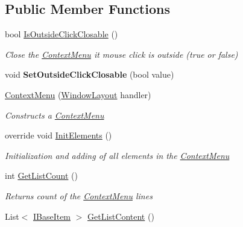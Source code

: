 \subsection*{Public Member Functions}
\begin{DoxyCompactItemize}
\item 
bool \mbox{\hyperlink{class_space_v_i_l_1_1_context_menu_ab679391d913d15a6341e9ccb0f3b4bf9}{Is\+Outside\+Click\+Closable}} ()
\begin{DoxyCompactList}\small\item\em Close the \mbox{\hyperlink{class_space_v_i_l_1_1_context_menu}{Context\+Menu}} it mouse click is outside (true or false) \end{DoxyCompactList}\item 
\mbox{\label{class_space_v_i_l_1_1_context_menu_aac0e4cbcc49f86a04fbab993b35d84b9}} 
void {\bfseries Set\+Outside\+Click\+Closable} (bool value)
\item 
\mbox{\hyperlink{class_space_v_i_l_1_1_context_menu_ab5587faf5fcbe8af55b80295a481bdbc}{Context\+Menu}} (\mbox{\hyperlink{class_space_v_i_l_1_1_window_layout}{Window\+Layout}} handler)
\begin{DoxyCompactList}\small\item\em Constructs a \mbox{\hyperlink{class_space_v_i_l_1_1_context_menu}{Context\+Menu}} \end{DoxyCompactList}\item 
override void \mbox{\hyperlink{class_space_v_i_l_1_1_context_menu_ad29ab07bf8241bc770aecd96801a37d8}{Init\+Elements}} ()
\begin{DoxyCompactList}\small\item\em Initialization and adding of all elements in the \mbox{\hyperlink{class_space_v_i_l_1_1_context_menu}{Context\+Menu}} \end{DoxyCompactList}\item 
int \mbox{\hyperlink{class_space_v_i_l_1_1_context_menu_af0c5909f660fd0db8b458849f0a3d182}{Get\+List\+Count}} ()
\begin{DoxyCompactList}\small\item\em Returns count of the \mbox{\hyperlink{class_space_v_i_l_1_1_context_menu}{Context\+Menu}} lines \end{DoxyCompactList}\item 
List$<$ \mbox{\hyperlink{interface_space_v_i_l_1_1_core_1_1_i_base_item}{I\+Base\+Item}} $>$ \mbox{\hyperlink{class_space_v_i_l_1_1_context_menu_a9cc6b338e39d87a707c2a873f089de0d}{Get\+List\+Content}} ()

\end{DoxyCompactItemize}
